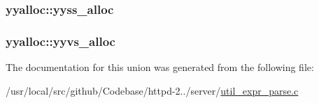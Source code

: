 \subsubsection[{\texorpdfstring{yyss\+\_\+alloc}{yyss_alloc}}]{ yyalloc\+::yyss\+\_\+alloc}\hypertarget{unionyyalloc_a4800e0520a89a4789afa7b5d82197e65}{}\label{unionyyalloc_a4800e0520a89a4789afa7b5d82197e65}
\subsubsection[{\texorpdfstring{yyvs\+\_\+alloc}{yyvs_alloc}}]{ yyalloc\+::yyvs\+\_\+alloc}\hypertarget{unionyyalloc_a9326f4fdc6f737a929444427836d8928}{}\label{unionyyalloc_a9326f4fdc6f737a929444427836d8928}


The documentation for this union was generated from the following file\+:\begin{DoxyCompactItemize}
\item 
/usr/local/src/github/\+Codebase/httpd-\/2../server/\hyperlink{util__expr__parse_8c}{util\+\_\+expr\+\_\+parse.\+c}\end{DoxyCompactItemize}
